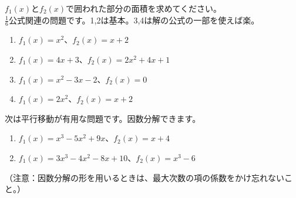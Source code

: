 \documentclass[12pt,a4paper]{jsarticle}
\begin{document}
$f_1(x)とf_2(x)$で囲われた部分の面積を求めてください。
\\
$\frac{1}{6}$公式関連の問題です。1,2は基本。3,4は解の公式の一部を使えば楽。

\begin{enumerate}
    \item $f_1(x)=x^2$、$f_2(x)=x+2$
    \item $f_1(x)=4x+3$、$f_2(x)=2x^2+4x+1$
    \item $f_1(x)=x^2-3x-2$、$f_2(x)=0$
    \item $f_1(x)=2x^2$、$f_2(x)=x+2$
\end{enumerate}
次は平行移動が有用な問題です。因数分解できます。
\begin{enumerate}
    \item $f_1(x)=x^3-5x^2+9x$、$f_2(x)=x+4$
    \item $f_1(x)=3x^3-4x^2-8x+10$、$f_2(x)=x^3-6$
\end{enumerate}
（注意：因数分解の形を用いるときは、最大次数の項の係数をかけ忘れないこと。）
\end{document}
